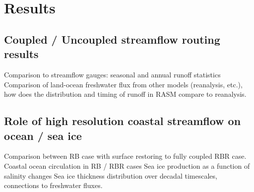 \section{Results}

\subsection{Coupled / Uncoupled streamflow routing results}

Comparison to streamflow gauges: seasonal and annual runoff statistics
Comparison of land-ocean freshwater flux from other models (reanalysis, etc.), how does the distribution and timing of runoff in RASM compare to reanalysis.

\subsection{Role of high resolution coastal streamflow on ocean / sea ice}


Comparison between RB case with surface restoring to fully coupled RBR case.
Coastal ocean circulation in RB / RBR cases
Sea ice production as a function of salinity changes
Sea ice thickness distribution over decadal timescales, connections to freshwater fluxes.

